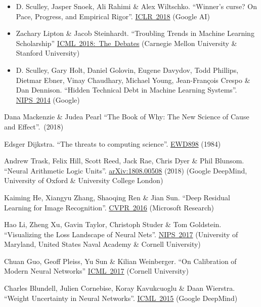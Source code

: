 \documentclass{article}
\begin{document}
\begin{thebibliography}{10}
\begin{itemize}
\item D. Sculley, Jasper Snoek, Ali Rahimi \& Alex Wiltschko. ``Winner's curse? On Pace, Progress, and Empirical Rigor''. \href{https://openreview.net/pdf?id=rJWF0Fywf}{ICLR~2018} (Google AI)
\item Zachary Lipton \& Jacob Steinhardt. ``Troubling Trends in Machine Learning Scholarship'' \href{https://arxiv.org/pdf/1807.03341.pdf}{ICML~2018:~The~Debates} (Carnegie Mellon University \& Stanford University)
\item D. Sculley, Gary Holt, Daniel Golovin, Eugene Davydov, Todd Phillips, Dietmar Ebner, Vinay Chaudhary, Michael Young, Jean-Fran\c{c}ois Crespo \& Dan Dennison. ``Hidden Technical Debt in Machine Learning Systems''. \href{https://papers.nips.cc/paper/5656-hidden-technical-debt-in-machine-learning-systems.pdf}{NIPS~2014} (Google)
\end{itemize}

 Dana Mackenzie \& Judea Pearl ``The Book of Why: The New Science of Cause and Effect''.~(2018)

 Edsger Dijkstra. ``The threats to computing science''. \href{http://www.cs.utexas.edu/users/EWD/transcriptions/EWD08xx/EWD898.html}{EWD898} (1984)

 Andrew Trask, Felix Hill, Scott Reed, Jack Rae, Chris Dyer \& Phil Blunsom. ``Neural Arithmetic Logic Units''. \href{https://arxiv.org/pdf/1808.00508.pdf}{arXiv:1808.00508} (2018) (Google DeepMind, University of Oxford \& University College London)

 Kaiming He, Xiangyu Zhang, Shaoqing Ren \& Jian Sun. ``Deep Residual Learning for Image Recognition''. \href{https://www.cv-foundation.org/openaccess/content_cvpr_2016/papers/He_Deep_Residual_Learning_CVPR_2016_paper.pdf}{CVPR~2016} (Microsoft Research)

 Hao Li, Zheng Xu, Gavin Taylor, Christoph Studer \& Tom Goldstein. ``Visualizing the Loss Landscape of Neural Nets''. \href{https://arxiv.org/pdf/1712.09913.pdf}{NIPS~2017} (University of Maryland, United States Naval Academy \& Cornell University)

 Chuan Guo, Geoff Pleiss, Yu Sun \& Kilian Weinberger. ``On Calibration of Modern Neural Networks'' \href{http://proceedings.mlr.press/v70/guo17a/guo17a.pdf} {ICML~2017} (Cornell University)

 Charles Blundell, Julien Cornebise, Koray Kavukcuoglu \& Daan Wierstra. ``Weight Uncertainty in Neural Networks''. \href{http://proceedings.mlr.press/v37/blundell15.pdf}{ICML~2015} (Google DeepMind)


\end{thebibliography}
\end{document}
